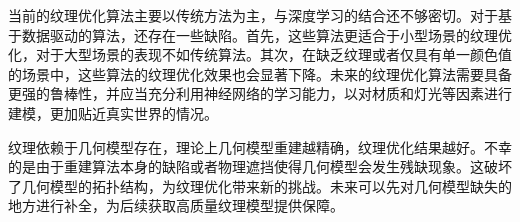 当前的纹理优化算法主要以传统方法为主，与深度学习的结合还不够密切。对于基于数据驱动的算法，还存在一些缺陷。首先，这些算法更适合于小型场景的纹理优化，对于大型场景的表现不如传统算法。其次，在缺乏纹理或者仅具有单一颜色值的场景中，这些算法的纹理优化效果也会显著下降。未来的纹理优化算法需要具备更强的鲁棒性，并应当充分利用神经网络的学习能力，以对材质和灯光等因素进行建模，更加贴近真实世界的情况。\par
纹理依赖于几何模型存在，理论上几何模型重建越精确，纹理优化结果越好。不幸的是由于重建算法本身的缺陷或者物理遮挡使得几何模型会发生残缺现象。这破坏了几何模型的拓扑结构，为纹理优化带来新的挑战。未来可以先对几何模型缺失的地方进行补全，为后续获取高质量纹理模型提供保障。